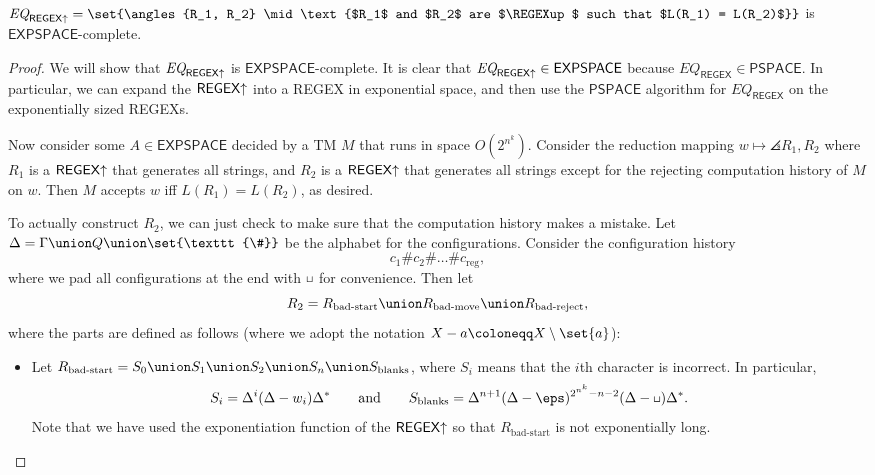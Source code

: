 \documentclass{standalone}
\begin{document}
\begin{theorem}
  \(\textit{EQ}_{\REGEXup} = \set{\angles{R_1, R_2} \mid \text{%
    $R_1$ and $R_2$ are $\REGEXup$ such that $L(R_1) = L(R_2)$%
  }}\) is \(\mathsf{EXPSPACE}\)-complete.
\end{theorem}
\begin{proof}
  We will show that \(\textit{EQ}_{\textsf{REGEX}\mathord\uparrow}\) is \(\mathsf{EXPSPACE}\)-complete. It is clear that \(\textit{EQ}_{\textsf{REGEX}\mathord\uparrow} \in \mathsf{EXPSPACE}\) because \(\textit{EQ}_{\textsf{REGEX}} \in \mathsf{PSPACE}\). In particular, we can expand the \(\textsf{REGEX}\mathord\uparrow\) into a \textsf{REGEX} in exponential space, and then use the \(\mathsf{PSPACE}\) algorithm for \(\textit{EQ}_{\textsf{REGEX}}\) on the exponentially sized \textsf{REGEX}s.

  Now consider some \(A \in \mathsf{EXPSPACE}\) decided by a \textsf{TM} \(M\) that runs in space \(O(2^{n^k})\). Consider the reduction mapping \(w \mapsto \angles{R_1, R_2}\) where \(R_1\) is a \(\textsf{REGEX}\mathord\uparrow\) that generates all strings, and \(R_2\) is a \(\textsf{REGEX}\mathord\uparrow\) that generates all strings except for the rejecting computation history of \(M\) on \(w\). Then \(M\) accepts \(w\) iff \(L(R_1) = L(R_2)\), as desired.

  To actually construct \(R_2\), we can just check to make sure that the computation history makes a mistake. Let \(\Delta = \Gamma \union Q \union \set{\texttt{\#}}\) be the alphabet for the configurations.
  Consider the configuration history
  \[
    c_1 \texttt{\#} c_2 \texttt{\#} \dots \texttt{\#} c_{\text{reg}},
  \]
  where we pad all configurations at the end with \(\blank\) for convenience. Then let
  \[
    R_2 = R_{\text{bad-start}} \union R_{\text{bad-move}} \union R_{\text{bad-reject}},
  \]
  where the parts are defined as follows
  (where we adopt the notation \(X - a \coloneqq X \setminus \set{a}\)):
  \begin{itemize}
    \item Let
          \(R_{\text{bad-start}} =
            S_0 \union S_1 \union S_2 \union S_n \union S_{\text{blanks}}\),
          where \(S_i\) means that the \(i\)th character is incorrect.
          In particular,
          \[
            S_i = \Delta^i (\Delta - w_i) \Delta^*
              \qquad \text{and} \qquad
              S_{\text{blanks}} = \Delta^{n + 1}
                                  (\Delta - \eps)^{2^{n^k} - n - 2}
                                  (\Delta - \blank) \Delta^*.
          \]
          Note that we have used the exponentiation function of
          the \(\textsf{REGEX}\mathord\uparrow\) so that \(R_{\text{bad-start}}\) is not
          exponentially long.


\end{itemize}
\end{proof}
\end{document}
